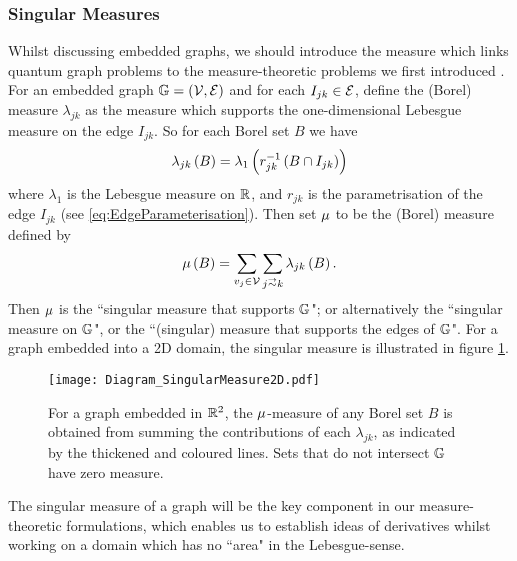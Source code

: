 \subsubsection{Singular Measures} \label{sssec:SingularMeasures}
Whilst discussing embedded graphs, we should introduce the measure which links quantum graph problems to the measure-theoretic problems we first introduced .
For an embedded graph $\mathbb{G} = \left( \mathcal{V},\mathcal{E} \right)$ and for each $I_{jk}\in \mathcal{E}$, define the (Borel) measure $\lambda_{jk}$ as the measure which supports the one-dimensional Lebesgue measure on the edge $I_{jk}$.
So for each Borel set $B$ we have
\begin{align*}
	\lambda_{jk}\left( B \right) = \lambda_{1}\left( r_{jk}^{-1}\left( B \cap I_{jk} \right) \right)
\end{align*}
where $\lambda_1$ is the Lebesgue measure on $\mathbb{R}$, and $r_{jk}$ is the parametrisation of the edge $I_{jk}$ (see \eqref{eq:EdgeParameterisation}).
Then set $\mu$ to be the (Borel) measure defined by
\begin{align*}
	\ddmes\bracs{B} = \sum_{v_j\in \vertSet}\sum_{j\conLeft k} \lambda_{jk}\bracs{B}.
\end{align*}
Then $\mu$ is the ``singular measure that supports $\mathbb{G}$"; or alternatively the ``singular measure on $\mathbb{G}$", or the ``(singular) measure that supports the edges of $\mathbb{G}$". 
For a graph embedded into a 2D domain, the singular measure is illustrated in figure \ref{fig:Diagram_SingularMeasure2D}.
\begin{figure}[t!]
	\centering
	\texttt{[image: Diagram\_SingularMeasure2D.pdf]}
	\caption{\label{fig:Diagram_SingularMeasure2D} For a graph embedded in $\mathbb{R}^2$, the $\mu$-measure of any Borel set $B$ is obtained from summing the contributions of each $\lambda_{jk}$, as indicated by the thickened and coloured lines.
	Sets that do not intersect $\mathbb{G}$ have zero measure.}
\end{figure} \newline

The singular measure of a graph will be the key component in our measure-theoretic formulations, which enables us to establish ideas of derivatives whilst working on a domain which has no ``area" in the Lebesgue-sense.


